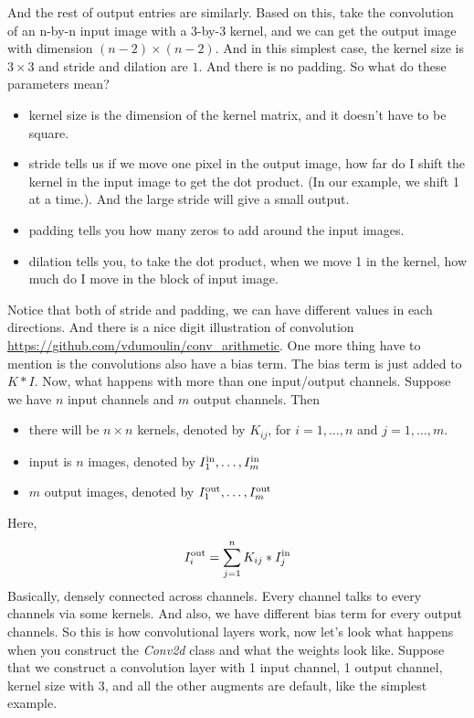 And the rest of output entries are similarly. Based on this, take the convolution of an n-by-n input image  with a  3-by-3 kernel, and we can get the output image with dimension $(n-2) \times (n-2)$. And in this simplest case, the kernel size is $3\times 3$ and stride and dilation are $1$. And there is no padding. So what do these parameters mean?
\begin{itemize}
\item kernel size is the dimension of the kernel matrix, and it doesn't have to be square.
\item stride tells us if we move one pixel in the output image, how far do I shift the kernel in the input image to get the dot product. (In our example, we shift 1 at a time.). And the large stride will give a small output. 
\item padding tells you how many zeros to add around the input images.
\item dilation tells you, to take the dot product, when we move 1 in the kernel, how much do I move in the block of input image.
\end{itemize}
Notice that both of stride and padding, we can have different values in each directions.
And there is a nice digit illustration of convolution \url{https://github.com/vdumoulin/conv_arithmetic}.
One more thing have to mention is the convolutions also have a bias term. The bias term is just added to $K*I$.
Now, what happens with more than one input/output channels.
Suppose we have $n$ input channels and $m$ output channels. Then 
\begin{itemize}
\item there will be $n\times n$ kernels, denoted by $K_{ij}$, for $i =1,\ldots,n$ and $j=1,\ldots,m$. 
\item input is $n$ images, denoted by $I_1^{\rm in}, \ldots, I_m^{\rm in}$
\item $m$ output images, denoted by $I_1^{\rm out}, \ldots, I_m^{\rm out}$
\end{itemize}
Here, 
$$I_{i}^{\rm out} = \sum_{j=1}^n K_{ij}*I_j^{\rm in}$$
Basically, densely connected across channels. Every channel talks to every channels via some kernels. And also, we have different bias term for every output channels.
So this is how convolutional layers work, now let's look what happens when you construct the \emph{Conv2d} class and what the weights look like. Suppose that we construct a convolution layer with 1 input channel, 1 output channel, kernel size with 3, and all the other augments are default, like the simplest example.  
